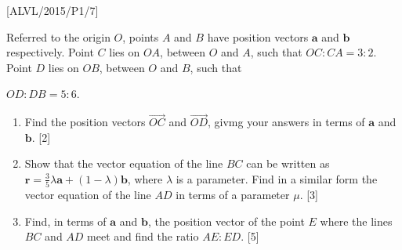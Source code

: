 \item {[}ALVL/2015/P1/7{]}

Referred to the origin $O$, points $A$ and $B$ have position vectors
$\mathbf{a}$ and $\mathbf{b}$ respectively. Point $C$ lies on $OA$,
between $O$ and $A$, such that $OC:CA=3:2$. Point $D$ lies on
$OB$, between $O$ and $B$, such that

$OD:DB=5:6$.
\begin{enumerate}
\item Find the position vectors $\vec{OC}$ and $\vec{OD}$, givmg your
answers in terms of $\mathbf{a}$ and $\mathbf{b}$.\hfill{} {[}2{]}
\item Show that the vector equation of the line $BC$ can be written as
$\mathbf{r}=\frac{3}{5}\lambda\mathbf{a}+\left(1-\lambda\right)\mathbf{b}$,
where $\lambda$ is a parameter. Find in a similar form the vector
equation of the line $AD$ in terms of a parameter $\mu$. \hfill{}{[}3{]}
\item Find, in terms of $\mathbf{a}$ and $\mathbf{b}$, the position vector
of the point $E$ where the lines $BC$ and $AD$ meet and find the
ratio $AE:ED$.\hfill{} {[}5{]}
\end{enumerate}
